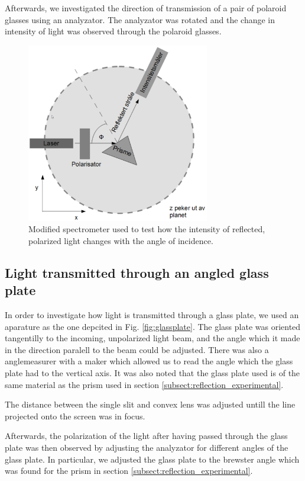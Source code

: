 \documentclass[11pt,a4paper]{article}
\begin{document}
      Afterwards, we investigated the direction of transmission of a pair of polaroid glasses using an analyzator. The analyzator was rotated and the change in intensity of light was observed through the polaroid glasses.

    \begin{figure}[H]
      \center
      \includegraphics[width=8cm]{scripts/figs/modified_spectrometer.png}
      \caption{Modified spectrometer used to test how the intensity of reflected, polarized light changes with the angle of incidence.}
      \label{fig:mod_spectro}
    \end{figure}

  \subsection{Light transmitted through an angled glass plate}

    In order to investigate how light is transmitted through a glass plate, we used an aparature as the one depcited in Fig. \ref{fig:glassplate}. The glass plate was oriented tangentilly to the incoming, unpolarized light beam, and the angle which it made in the direction paralell to the beam could be adjusted. There was also a anglemeasurer with a maker which allowed us to read the angle which the glass plate had to the vertical axis. It was also noted that the glass plate used is of the same material as the prism used in section \ref{subsect:reflection_experimental}.

    The distance between the single slit and convex lens was adjusted untill the line projected onto the screen was in focus.

    Afterwards, the polarization of the light after having passed through the glass plate was then observed by adjusting the analyzator for different angles of the glass plate. In particular, we adjusted the glass plate to the brewster angle which was found for the prism in section \ref{subsect:reflection_experimental}.
\end{document}
